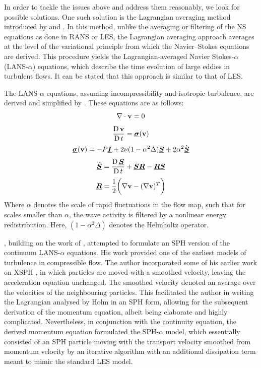 In order to tackle the issues above and address them reasonably, we look for possible solutions. One such solution is the Lagrangian averaging method introduced by \cite{holm1998euler} and \cite{Marsden2001}. In this method, unlike the averaging or filtering of the NS equations as done in RANS or LES, the Lagrangian averaging approach averages at the level of the variational principle from which the Navier–Stokes equations are derived. This procedure yields the Lagrangian-averaged Navier Stokes-$\alpha$ (LANS-$\alpha$) equations, which describe the time evolution of large eddies in turbulent flows. It can be stated that this approach is similar to that of LES.

The LANS-$\alpha$ equations, assuming incompressibility and isotropic turbulence, are derived and simplified by \cite{Mohseni2003}. These equations are as follows:
\begin{equation}
    \nabla \cdot \mathbf{v} = 0
\end{equation}
\begin{equation}
    \frac{\operatorname{D} \mathbf{v}}{\operatorname{D} t} = \underline{\bm{\sigma}}(\mathbf{v})
\end{equation}
\begin{equation}
    \underline{\bm{\sigma}}(\mathbf{v}) = -P\underline{\bm{I}} + 2\nu(1 - \alpha^2\Delta)\underline{\bm{S}} + 2\alpha^2\Dot{\underline{\bm{S}}}
    \label{eq:LANS-alpha-stress-tensor}
\end{equation}
\begin{equation}
    \Dot{\underline{\bm{S}}} = \frac{\operatorname{D} \underline{\bm{S}}}{\operatorname{D} t} + \underline{\bm{S}}\underline{\bm{R}} - \underline{\bm{R}}\underline{\bm{S}}
\end{equation}
\begin{equation}
    \underline{\bm{R}} = \frac{1}{2}\bigg(\nabla\mathbf{v}-(\nabla\mathbf{v})^T\bigg)
\end{equation}
Where $\alpha$ denotes the scale of rapid fluctuations in the flow map, such that for scales smaller than $\alpha$, the wave activity is filtered by a nonlinear energy redistribution. Here, $(1 - \alpha^2 \Delta)$ denotes the Helmholtz operator.

\cite{Monaghan2002}, building on the work of \cite{holm1998euler}, attempted to formulate an SPH version of the continuum LANS-$\alpha$ equations. His work provided one of the earliest models of turbulence in compressible flow. The author incorporated some of his earlier work on XSPH \parencite{monaghan1989problem}, in which particles are moved with a smoothed velocity, leaving the acceleration equation unchanged. The smoothed velocity denoted an average over the velocities of the neighbouring particles. This facilitated the author in writing the Lagrangian analysed by Holm in an SPH form, allowing for the subsequent derivation of the momentum equation, albeit being elaborate and highly complicated. Nevertheless, in conjunction with the continuity equation, the derived momentum equation formulated the SPH-$\alpha$ model, which essentially consisted of an SPH particle moving with the transport velocity smoothed from momentum velocity by an iterative algorithm with an additional dissipation term meant to mimic the standard LES model.

